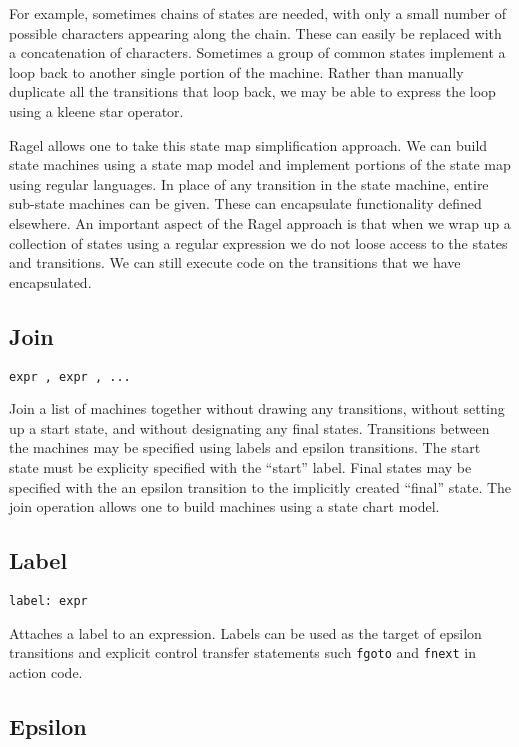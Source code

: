 \documentclass[letterpaper,11pt,oneside]{book}
\newcommand{\verbspace}{\vspace{10pt}}
\begin{document}
For example, sometimes chains of states are needed, with only a small number of
possible characters appearing along the chain. These can easily be replaced
with a concatenation of characters. Sometimes a group of common states
implement a loop back to another single portion of the machine. Rather than
manually duplicate all the transitions that loop back, we may be able to
express the loop using a kleene star operator.

Ragel allows one to take this state map simplification approach. We can build
state machines using a state map model and implement portions of the state map
using regular languages. In place of any transition in the state machine,
entire sub-state machines can be given. These can encapsulate functionality
defined elsewhere. An important aspect of the Ragel approach is that when we
wrap up a collection of states using a regular expression we do not loose
access to the states and transitions. We can still execute code on the
transitions that we have encapsulated.

\subsection{Join}

\verb|expr , expr , ...|
\verbspace

Join a list of machines together without
drawing any transitions, without setting up a start state, and without
designating any final states. Transitions between the machines may be specified
using labels and epsilon transitions. The start state must be explicity
specified with the ``start'' label. Final states may be specified with the an
epsilon transition to the implicitly created ``final'' state. The join
operation allows one to build machines using a state chart model.

\subsection{Label}

\verb|label: expr| 
\verbspace

Attaches a label to an expression. Labels can be
used as the target of epsilon transitions and explicit control transfer
statements such \verb|fgoto| and \verb|fnext| in action
code.

\subsection{Epsilon}
\end{document}
